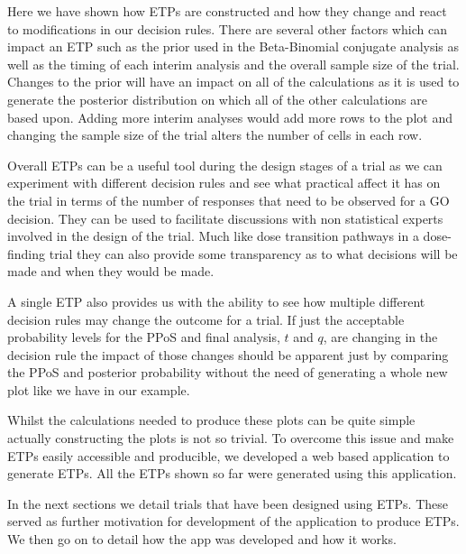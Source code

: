 \newpage

Here we have shown how ETPs are constructed and how they change and react to modifications in our decision rules. There are several other factors which can impact an ETP such as the prior used in the Beta-Binomial conjugate analysis as well as the timing of each interim analysis and the overall sample size of the trial. Changes to the prior will have an impact on all of the calculations as it is used to generate the posterior distribution on which all of the other calculations are based upon. Adding more interim analyses would add more rows to the plot and changing the sample size of the trial alters the number of cells in each row. 

Overall ETPs can be a useful tool during the design stages of a trial as we can experiment with different decision rules and see what practical affect it has on the trial in terms of the number of responses that need to be observed for a GO decision. They can be used to facilitate discussions with non statistical experts involved in the design of the trial. Much like dose transition pathways in a dose-finding trial they can also provide some transparency as to what decisions will be made and when they would be made. 

A single ETP also provides us with the ability to see how multiple different decision rules may change the outcome for a trial. If just the acceptable probability levels for the PPoS and final analysis, $t$ and $q$, are changing in the decision rule the impact of those changes should be apparent just by comparing the PPoS and posterior probability without the need of generating a whole new plot like we have in our example.

Whilst the calculations needed to produce these plots can be quite simple actually constructing the plots is not so trivial. To overcome this issue and make ETPs easily accessible and producible, we developed a web based application to generate ETPs. All the ETPs shown so far were generated using this application. 

In the next sections we detail trials that have been designed using ETPs. These served as further motivation for development of the application to produce ETPs. We then go on to detail how the app was developed and how it works.    


